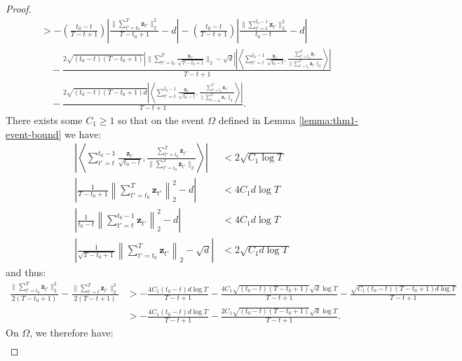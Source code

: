 \begin{proof}
\begin{align*}
    &> -\left(\frac{t_0-t}{T-t+1}\right)\left|\frac{\lVert\sum_{t'=t_0}^T\mathbf{z}_{t'}\rVert_2^2}{T-t_0 + 1} - d\right| - \left(\frac{t_0-t}{T-t+1}\right)\left|\frac{\lVert\sum_{t'=t}^{t_0-1}\mathbf{z}_{t'}\rVert_2^2}{t_0-t} -d \right| \\
    &\quad -\frac{2\sqrt{(t_0-t)(T-t_0+1)}\left|\lVert\sum_{t'=t_0}^{T}\frac{\mathbf{z}_{t'}}{\sqrt{T-t_0+1}}\rVert_2 -\sqrt{d}\right|\left|\left\langle \sum_{t'=t}^{t_0-1}\frac{\mathbf{z}_{t'}}{\sqrt{t_0-t}}, \frac{\sum_{t'=t_0}^{T}\mathbf{z}_{t'}}{\lVert\sum_{t'=t_0}^{T}\mathbf{z}_{t'}\rVert_2}\right\rangle\right|}{T-t+1} \\
    &\quad-\frac{2\sqrt{(t_0-t)(T-t_0+1)d}\left|\left\langle \sum_{t'=t}^{t_0-1}\frac{\mathbf{z}_{t'}}{\sqrt{t_0-t}}, \frac{\sum_{t'=t_0}^T\mathbf{z}_{t'}}{\lVert\sum_{t'=t_0}^T\mathbf{z}_{t'}\rVert_2}\right\rangle\right|}{T-t+1}.
\end{align*}
\normalsize
There exists some $C_1 \geq 1$ so that on the event $\Omega$ defined in Lemma \ref{lemma:thm1-event-bound} we have:
\begin{align*}
    \left|\left\langle \sum_{t'=t}^{t_0-1}\frac{\mathbf{z}_{t'}}{\sqrt{t_0-t}}, \frac{\sum_{t'=t_0}^{T}\mathbf{z}_{t'}}{\lVert\sum_{t'=t_0}^{T}\mathbf{z}_{t'}\rVert_2}\right\rangle\right| &< 2\sqrt{C_1\log T} \tag{on $\Omega_3\subseteq\Omega$} \\
    \left|\frac{1}{T-t_0+1}\left\lVert\sum_{t'=t_0}^T\mathbf{z}_{t'}\right\rVert_2^2 - d\right| &< 4C_1d\log T \tag{on $\Omega_4\subseteq\Omega$} \\
    \left|\frac{1}{t_0-t}\left\lVert\sum_{t'=t}^{t_0-1}\mathbf{z}_{t'}\right\rVert_2^2 - d\right| &< 4C_1d\log T \tag{on $\Omega_5\subseteq\Omega$} \\
    \left|\frac{1}{\sqrt{T-t_0+1}}\left\lVert\sum_{t'=t_0}^{T}\mathbf{z}_{t'}\right\rVert_2 -\sqrt{d}\right| &< 2\sqrt{C_1 d\log T} \tag{on $\Omega_6\subseteq\Omega$} 
\end{align*}
and thus:
\small
\begin{align*}
    \frac{\lVert\sum_{t'=t_0}^T\mathbf{z}_{t'}\rVert_2^2}{2(T-t_0+1)} - \frac{\lVert\sum_{t'=t}^T\mathbf{z}_{t'}\rVert_2^2}{2(T-t+1)} &> -\frac{4C_1(t_0-t)d\log T}{T-t+1} - \frac{4C_1\sqrt{(t_0-t)(T-t_0+1)}\sqrt{d}\log T}{T-t+1} - \frac{\sqrt{C_1(t_0-t)(T-t_0+1)d\log T}}{T-t+1}\\
    &> -\frac{4C_1(t_0-t)d\log T}{T-t+1} - \frac{2C_1\sqrt{(t_0-t)(T-t_0+1)}\sqrt{d}\log T}{T-t+1}.
\end{align*}
\normalsize
On $\Omega$, we therefore have:
\begin{align*}

\end{align*}
\end{proof}
